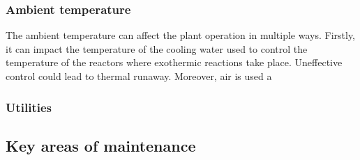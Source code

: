 \subsubsection{Ambient temperature}

The ambient temperature can affect the plant operation in multiple ways. Firstly, it can impact the temperature of the cooling water used to control the temperature of the reactors where exothermic reactions take place. Uneffective control could lead to thermal runaway. Moreover, air is used a 

\subsubsection{Utilities}


\subsection{Key areas of maintenance} %